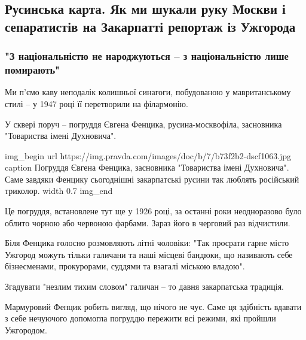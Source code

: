  
 
 

\subsection{Русинська карта. Як ми шукали руку Москви і сепаратистів на Закарпатті \textemdash репортаж із Ужгорода}




\subsubsection{"З національністю не народжуються – з національністю лише
помирають"}

Ми п’ємо каву неподалік колишньої синагоги, побудованою у мавританському стилі
– у 1947 році її перетворили на філармонію.

У сквері поруч – погруддя Євгена Фенцика, русина-москвофіла, засновника
"Товариства імені Духновича".

\ifcmt
img_begin 
        url https://img.pravda.com/images/doc/b/7/b73f2b2-dscf1063.jpg
        caption Погруддя Євгена Фенцика, засновника "Товариства імені Духновича". Саме завдяки Фенцику сьогоднішні закарпатські русини так люблять російський триколор.
        width 0.7
img_end
\fi

Це погруддя, встановлене тут ще у 1926 році, за останні роки неодноразово було
облито чорною або червоною фарбами. Зараз його в черговий раз відчистили.

Біля Фенцика голосно розмовляють літні чоловіки: "Так просрати гарне місто
Ужгород можуть тільки галичани та наші місцеві бандюки, що називають себе
бізнесменами, прокурорами, суддями та взагалі міською владою".

Згадувати "незлим тихим словом" галичан – то давня закарпатська традиція.

Мармуровий Фенцик робить вигляд, що нічого не чує. Саме ця здібність вдавати з
себе нечуючого допомогла погруддю пережити всі режими, які пройшли Ужгородом.

